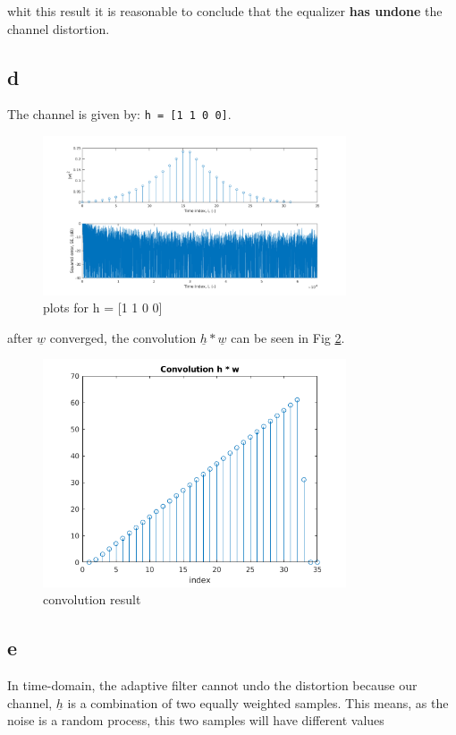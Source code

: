 \documentclass[12pt,letterpaper]{article}
\begin{document}
whit this result it is reasonable to conclude that the equalizer \textbf{has undone} the channel distortion.

\subsection{d}

The channel is given by: \texttt{h = [1 1 0 0]}.

\begin{figure}[!h] 
  \centering
  \includegraphics[width=0.8\textwidth]{../matlab/img/f4.png}
  \caption{plots for h = [1 1 0 0]}
  \label{fig:f4}
\end{figure}

after $\underline{w}$ converged, the convolution $\underline{h}*\underline{w}$ can be seen in Fig \ref{fig:conv2}.

\begin{figure}[!h] 
  \centering
  \includegraphics[width=0.8\textwidth]{../matlab/img/conv2.png}
  \caption{convolution result}
  \label{fig:conv2}
\end{figure}

\subsection{e}
In time-domain, the adaptive filter cannot undo the distortion because our channel, $\underline{h}$ is a combination of two 
equally weighted samples. This means, as the noise is a random process, this two samples will have different values 
\end{document}
